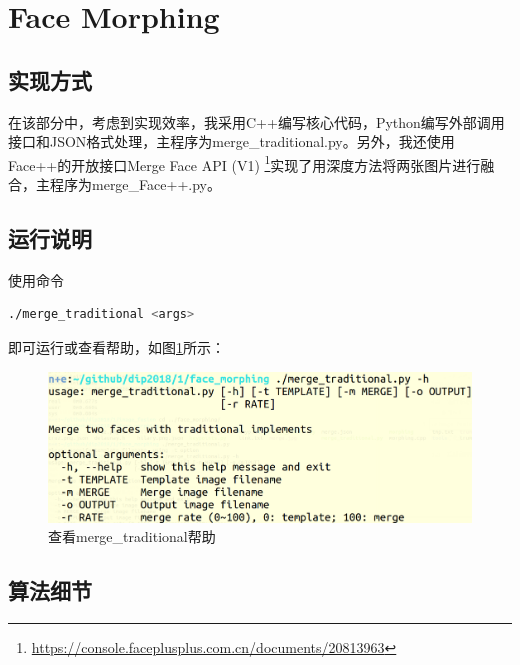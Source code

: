 \documentclass[a4paper]{article}
\begin{document}
\section{Face Morphing}
\subsection{实现方式}

在该部分中，考虑到实现效率，我采用C++编写核心代码，Python编写外部调用接口和JSON格式处理，主程序为merge\_traditional.py。另外，我还使用Face++的开放接口Merge Face API (V1) \footnote{\url{https://console.faceplusplus.com.cn/documents/20813963}}实现了用深度方法将两张图片进行融合，主程序为merge\_Face++.py。

\subsection{运行说明}
使用命令
\begin{lstlisting}[language=bash]
./merge_traditional <args>
\end{lstlisting}
即可运行或查看帮助，如图\ref{fig:3-1}所示：
\begin{figure}[htp]
\centering
\includegraphics[width=1\linewidth]{3_1.png}
\caption{查看merge\_traditional帮助}
\label{fig:3-1}
\end{figure}

\subsection{算法细节}


\newpage 
{}

\end{document}
